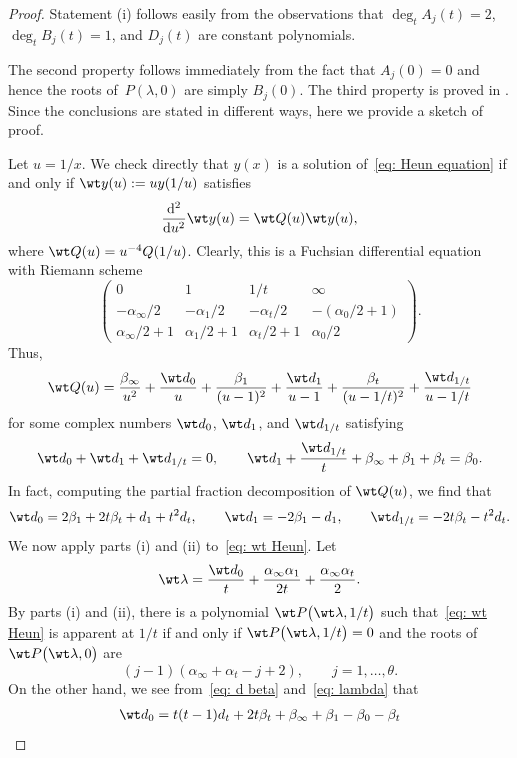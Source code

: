 \begin{proof}
Statement (i) follows easily from the observations that
 $\deg_t A_j(t)=2$, ${\deg_tB_j(t)=1}$, and $D_j(t)$ are
 constant polynomials.

 The second property follows immediately from the fact that
 $A_j(0)=0$ and hence the roots of~$P(\lambda,0)$ are simply
 $B_j(0)$. The third property is proved in \cite[Theorem~B.3]{Chen-Lin-Yang}. Since the conclusions are stated in different
 ways, here we provide a sketch of proof.

 Let $u=1/x$. We check directly that $y(x)$ is a solution of~\eqref{eq: Heun equation} if and only if $\wt y(u):=uy(1/u)$
 satisfies
 \begin{equation} \label{eq: wt Heun}
 \frac{{\rm d}^2}{{\rm d}u^2}\wt y(u)=\wt Q(u)\wt y(u),
 \end{equation}
 where $\wt Q(u)=u^{-4}Q(1/u)$. Clearly, this is a Fuchsian
 differential equation with Riemann scheme
\[
 \begin{pmatrix}
 0 & 1 & 1/t & \infty \\
 -\alpha_\infty/2 & -\alpha_1/2 & -\alpha_t/2 &
 -(\alpha_0/2+1) \\
 \alpha_\infty/2+1 & \alpha_1/2+1 & \alpha_t/2+1
 & \alpha_0/2 \end{pmatrix}.
\]
 Thus,
\[
 \wt Q(u)=\frac{\beta_\infty}{u^2}+\frac{\wt d_0}u
 +\frac{\beta_1}{(u-1)^2}+\frac{\wt d_1}{u-1}
 +\frac{\beta_t}{(u-1/t)^2}+\frac{\wt d_{1/t}}{u-1/t}
\]
 for some complex numbers $\wt d_0$, $\wt d_1$, and $\wt d_{1/t}$
 satisfying
\[
 \wt d_0+\wt d_1+\wt d_{1/t}=0, \qquad
 \wt d_1+\frac{\wt d_{1/t}}t+\beta_\infty+\beta_1+\beta_t=\beta_0.
\]
In fact, computing the partial fraction decomposition of $\wt Q(u)$,
 we find that
\[
 \wt d_0=2\beta_1+2t\beta_t+d_1+t^2d_t, \qquad
 \wt d_1=-2\beta_1-d_1, \qquad
 \wt d_{1/t}=-2t\beta_t-t^2d_t.
\]
 We now apply parts (i) and (ii) to~\eqref{eq: wt Heun}. Let
\[
 \wt\lambda=\frac{\wt d_0}t+\frac{\alpha_\infty\alpha_1}{2t}
 +\frac{\alpha_\infty\alpha_t}2.
\]
 By parts (i) and (ii), there is a polynomial $\wt P\bigl(\wt\lambda,1/t\bigr)$
 such that~\eqref{eq: wt Heun} is apparent at $1/t$ if and only if
 $\wt P\bigl(\wt\lambda,1/t\bigr)=0$ and the roots of $\wt P\bigl(\wt\lambda,0\bigr)$
 are
\[
 (j-1)(\alpha_\infty+\alpha_t-j+2), \qquad
 j=1,\dots,\theta.
\]
 On the other hand, we see from~\eqref{eq: d beta} and~\eqref{eq: lambda} that
 \begin{align*}\wt d_0
 &{}=t(t-1)d_t+2t\beta_t+\beta_\infty+\beta_1-\beta_0-\beta_t\\

\end{align*}
\end{proof}
